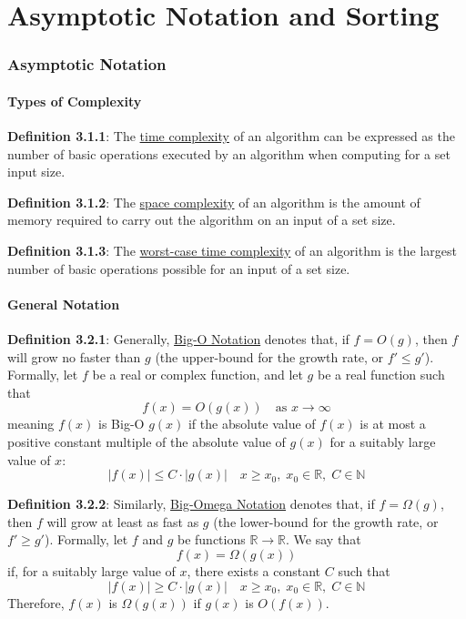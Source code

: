 \documentclass{article}
\newcommand{\separate}[1] {\vspace{#1 pt}\noindent}
\newcommand{\R}{\mathbb{R}}
\newcommand{\N}{\mathbb{N}}
\newcommand{\definition}[2]{\textbf{Definition #1}: #2\label{def:#1}}
\begin{document}
\newpage\part{Asymptotic Notation and Sorting}\label{part:2.ans}

\section{Asymptotic Notation}

\subsection{Types of Complexity}

\definition{3.1.1}{The \underline{time complexity} of an algorithm can be expressed as the number of basic operations executed by an algorithm when computing for a set input size.}

\separate{5}\definition{3.1.2}{The \underline{space complexity} of an algorithm is the amount of memory required to carry out the algorithm on an input of a set size.}

\separate{5}\definition{3.1.3}{The \underline{worst-case time complexity} of an algorithm is the largest number of basic operations possible for an input of a set size.}

\subsection{General Notation}

\definition{3.2.1}{Generally, \underline{Big-O Notation} denotes that, if \(f = O(g)\), then \(f\) will grow no faster than \(g\) (the upper-bound for the growth rate, or \(f' \leq g'\)).} Formally, let \(f\) be a real or complex function, and let \(g\) be a real function such that
\begin{equation}
    f(x) = O(g(x)) \quad\text{as } x \rightarrow \infty
\end{equation}
meaning \(f(x)\) is Big-O \(g(x)\) if the absolute value of \(f(x)\) is at most a positive constant multiple of the absolute value of \(g(x)\) for a suitably large value of \(x\):
\begin{equation}
    |f(x)| \leq C \cdot |g(x)| \quad x \geq x_0, \; x_0 \in \R, \; C \in \N
\end{equation}

\separate{5}\definition{3.2.2}{Similarly, \underline{Big-Omega Notation} denotes that, if \(f=\Omega(g)\), then \(f\) will grow at least as fast as \(g\) (the lower-bound for the growth rate, or \(f' \geq g'\)).} Formally, let \(f\) and \(g\) be functions \(\R \rightarrow \R\). We say that 
\begin{equation}
    f(x) = \Omega(g(x))
\end{equation}
if, for a suitably large value of \(x\), there exists a constant \(C\) such that
\begin{equation}
    |f(x)| \geq C \cdot |g(x)| \quad x \geq x_0, \; x_0 \in \R, \; C \in \N
\end{equation}
Therefore, \(f(x)\) is \(\Omega(g(x))\) if \(g(x)\) is \(O(f(x))\).
\end{document}
